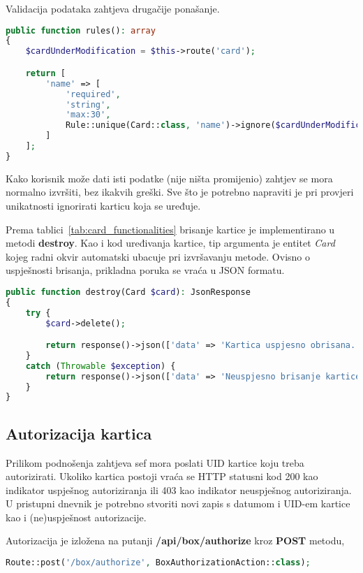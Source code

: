 Validacija podataka zahtjeva drugačije ponašanje.

\begin{lstlisting}[language=PHP]
public function rules(): array
{
    $cardUnderModification = $this->route('card');

    return [
        'name' => [
            'required',
            'string',
            'max:30',
            Rule::unique(Card::class, 'name')->ignore($cardUnderModification->id)
        ]
    ];
}
\end{lstlisting}

Kako korisnik može dati isti podatke (nije ništa promijenio) zahtjev se mora normalno izvršiti, bez ikakvih greški.
Sve što je potrebno napraviti je pri provjeri unikatnosti ignorirati karticu koja se uređuje.

Prema tablici~\ref{tab:card_functionalities} brisanje kartice je implementirano u metodi \textbf{destroy}.
Kao i kod uređivanja kartice, tip argumenta je entitet \textit{Card} kojeg radni okvir automatski ubacuje pri izvršavanju metode.
Ovisno o uspješnosti brisanja, prikladna poruka se vraća u JSON formatu.

\begin{lstlisting}[language=PHP]
public function destroy(Card $card): JsonResponse
{
    try {
        $card->delete();

        return response()->json(['data' => 'Kartica uspjesno obrisana.']);
    }
    catch (Throwable $exception) {
        return response()->json(['data' => 'Neuspjesno brisanje kartice. Pokusajte ponovo!']);
    }
}
\end{lstlisting}

\subsection{Autorizacija kartica}

Prilikom podnošenja zahtjeva sef mora poslati UID kartice koju treba autorizirati.
Ukoliko kartica postoji vraća se HTTP statusni kod 200 kao indikator uspješnog autoriziranja ili 403 kao indikator
neuspješnog autoriziranja.
U pristupni dnevnik je potrebno stvoriti novi zapis s datumom i UID-em kartice kao i (ne)uspješnost autorizacije.

Autorizacija je izložena na putanji \textbf{/api/box/authorize} kroz \textbf{POST} metodu,

\begin{lstlisting}[language=PHP]
Route::post('/box/authorize', BoxAuthorizationAction::class);
\end{lstlisting}


